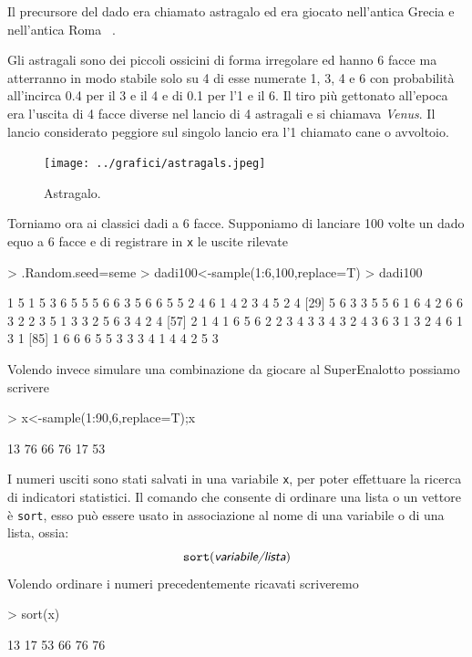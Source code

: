 \documentclass[onecolumn,11pt]{book}
\newcommand{\varia}[1]{\textsl{\textsf{#1}}}
\begin{document}
Il precursore  del dado era chiamato astragalo ed era giocato nell'antica Grecia e nell'antica Roma
~\cite{david}.
  
 Gli  astragali sono dei piccoli ossicini di forma irregolare ed hanno 6 facce ma atterranno in  modo stabile solo su 4 di esse numerate 1, 3, 4 e 6  con probabilit\`a all'incirca 0.4 per il 3 e il 4  e di 0.1 per l'1 e il 6.
Il tiro pi\`u gettonato all'epoca era l'uscita di 4 facce diverse nel lancio di 4 astragali e si chiamava {\it Venus}.
Il lancio considerato peggiore sul singolo lancio era l'1 chiamato cane o avvoltoio.
\begin{figure}[htbp]
\begin{center}
\texttt{[image: ../grafici/astragals.jpeg]}
\caption{ Astragalo. }
\label{fig:daiist}
\end{center}
\end{figure}
Torniamo ora ai classici dadi a 6 facce.
Supponiamo di lanciare 100 volte un dado equo a 6 facce e di registrare in \texttt{x}
le uscite rilevate 
\begin{Schunk}
\begin{Sinput}
> .Random.seed=seme
> dadi100<-sample(1:6,100,replace=T)
> dadi100
\end{Sinput}
\begin{Soutput}
  [1] 1 5 1 5 3 6 5 5 5 6 6 3 5 6 6 5 5 2 4 6 1 4 2 3 4 5 2 4
 [29] 5 6 3 3 5 5 6 1 6 4 2 6 6 3 2 2 3 5 1 3 3 2 5 6 3 4 2 4
 [57] 2 1 4 1 6 5 6 2 2 3 4 3 3 4 3 2 4 3 6 3 1 3 2 4 6 1 3 1
 [85] 1 6 6 6 5 5 3 3 3 4 1 4 4 2 5 3
\end{Soutput}
\end{Schunk}
Volendo invece simulare una combinazione da giocare al SuperEnalotto possiamo scrivere
\begin{Schunk}
\begin{Sinput}
> x<-sample(1:90,6,replace=T);x
\end{Sinput}
\begin{Soutput}
[1] 13 76 66 76 17 53
\end{Soutput}
\end{Schunk}
 I numeri usciti sono stati salvati  in una variabile \texttt{x}, per poter effettuare la ricerca di indicatori statistici.
Il comando che consente di ordinare una lista o un vettore \`e \texttt{sort}, esso pu\`o essere usato in associazione al nome di una variabile o di una lista, ossia:
\begin{equation}\texttt{sort}(\varia{variabile/lista})\end{equation}
Volendo ordinare i numeri precedentemente ricavati scriveremo
\begin{Schunk}
\begin{Sinput}
> sort(x)
\end{Sinput}
\begin{Soutput}
[1] 13 17 53 66 76 76
\end{Soutput}
\end{Schunk}
\end{document}
